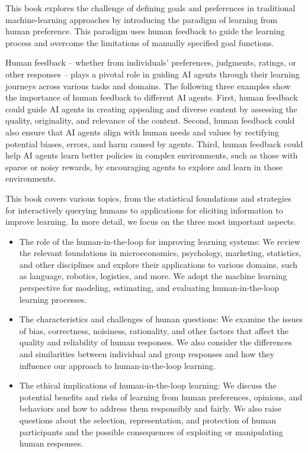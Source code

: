 \documentclass[
  letterpaper,
  DIV=11,
  numbers=noendperiod,
  oneside]{scrreprt}
\theoremstyle{remark}
\begin{document}
This book explores the challenge of defining goals and preferences in
traditional machine-learning approaches by introducing the paradigm of
learning from human preference. This paradigm uses human feedback to
guide the learning process and overcome the limitations of manually
specified goal functions.

Human feedback -- whether from individuals' preferences, judgments,
ratings, or other responses -- plays a pivotal role in guiding AI agents
through their learning journeys across various tasks and domains. The
following three examples show the importance of human feedback to
different AI agents. First, human feedback could guide AI agents in
creating appealing and diverse content by assessing the quality,
originality, and relevance of the content. Second, human feedback could
also ensure that AI agents align with human needs and values by
rectifying potential biases, errors, and harm caused by agents. Third,
human feedback could help AI agents learn better policies in complex
environments, such as those with sparse or noisy rewards, by encouraging
agents to explore and learn in those environments.

This book covers various topics, from the statistical foundations and
strategies for interactively querying humans to applications for
eliciting information to improve learning. In more detail, we focus on
the three most important aspects.

\begin{itemize}
\item
  The role of the human-in-the-loop for improving learning systems: We
  review the relevant foundations in microeconomics, psychology,
  marketing, statistics, and other disciplines and explore their
  applications to various domains, such as language, robotics,
  logistics, and more. We adopt the machine learning perspective for
  modeling, estimating, and evaluating human-in-the-loop learning
  processes.
\item
  The characteristics and challenges of human questions: We examine the
  issues of bias, correctness, noisiness, rationality, and other factors
  that affect the quality and reliability of human responses. We also
  consider the differences and similarities between individual and group
  responses and how they influence our approach to human-in-the-loop
  learning.
\item
  The ethical implications of human-in-the-loop learning: We discuss the
  potential benefits and risks of learning from human preferences,
  opinions, and behaviors and how to address them responsibly and
  fairly. We also raise questions about the selection, representation,
  and protection of human participants and the possible consequences of
  exploiting or manipulating human responses.
\end{itemize}
\end{document}
